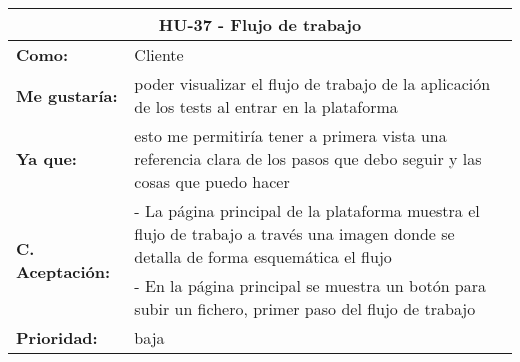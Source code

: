 
\begin{table}[H]
	\begin{tabular}{| p{3cm}| p{11cm} |}
		\hline
		\multicolumn{2}{|c|}{\textbf{HU-37} - Flujo de trabajo} \\ \hline
		\textbf{Como:} & Cliente \\ \hline
		\textbf{Me gustaría:} & poder visualizar el flujo de trabajo de la aplicación de los tests al entrar en la plataforma \\ \hline
		\textbf{Ya que:} & esto me permitiría tener a primera vista una referencia clara de los pasos que debo seguir y las cosas que puedo hacer \\ \hline
		\multirow{2}{11cm}{\textbf{C. Aceptación:}} & - La página principal de la plataforma muestra el flujo de trabajo a través una imagen donde se detalla de forma esquemática el flujo \\
		& - En la página principal se muestra un botón para subir un fichero, primer paso del flujo de trabajo \\ \hline
		\textbf{\textbf{Prioridad:}} & baja \\ \hline
	\end{tabular}
\end{table}


